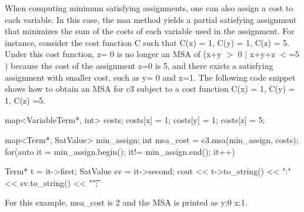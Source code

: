 \-When computing minimum satisfying assignments, one can also assign a cost to each variable. \-In this case, the msa method yields a partial satisfying assignment that minimizes the sum of the costs of each variable used in the assignment. \-For instance, consider the cost function \-C such that \-C(x) = 1, \-C(y) = 1, \-C(z) = 5. \-Under this cost function, z= 0 is no longer an \-M\-S\-A of (x+y $>$ 0 $|$ x+y+z $<$=5 ) because the cost of the assignment z=0 is 5, and there exists a satisfying assignment with smaller cost, such as y= 0 and x=1. \-The following code snippet shows how to obtain an \-M\-S\-A for c3 subject to a cost function \-C(x) = 1, \-C(y) = 1, \-C(z) =5.

\begin{DoxyVerb}
map<VariableTerm*, int> costs;
costs[x] = 1;
costs[y] = 1;
costs[z] = 5;


map<Term*, SatValue> min_assign;
int msa_cost = c3.msa(min_assign, costs);
for(auto it = min_assign.begin(); it!= min_assign.end(); it++) {
	Term* t = it->first;
	SatValue sv = it->second;
	cout << t->to_string() << ":" << sv.to_string() << "\t";

}
\end{DoxyVerb}


\-For this example, msa\-\_\-cost is 2 and the \-M\-S\-A is printed as y\-:0 x\-:1. 